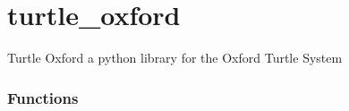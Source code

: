 \documentclass[letterpaper,10pt,english]{sphinxmanual}
\begin{document}
\sphinxstepscope


\section{turtle\_oxford}
\label{\detokenize{generated/turtle_oxford:module-turtle_oxford}}\label{\detokenize{generated/turtle_oxford:turtle-oxford}}\label{\detokenize{generated/turtle_oxford::doc}}
\sphinxAtStartPar
Turtle Oxford \sphinxhyphen{} a python library for the Oxford Turtle System
\subsubsection*{Functions}
\end{document}
